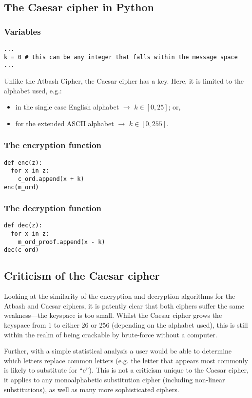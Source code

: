 \documentclass{AIAA}
\begin{document}
\subsection{The Caesar cipher in Python}

\subsubsection{Variables}
\begin{verbatim}
...
k = 0 # this can be any integer that falls within the message space
...
\end{verbatim}
Unlike the Atbash Cipher, the Caesar cipher has a key. Here, it is limited to the alphabet used, e.g.:
\begin{itemize}
	\item in the single case English alphabet $\longrightarrow$ $k \in [0,25]$; or,
	\item for the extended ASCII alphabet $\longrightarrow$ $k \in [0,255]$.
\end{itemize}

\subsubsection{The encryption function}
\begin{verbatim}
def enc(z):
  for x in z:
    c_ord.append(x + k)
enc(m_ord)
\end{verbatim}

\subsubsection{The decryption function}
\begin{verbatim}
def dec(z):
  for x in z:
    m_ord_proof.append(x - k)
dec(c_ord)
\end{verbatim}

\subsection{Criticism of the Caesar cipher}
Looking at the similarity of the encryption and decryption algorithms for the Atbash and Caesar ciphers, it is patently clear that both ciphers suffer the same weakness---the keyspace is too small. Whilst the Caesar cipher grows the keyspace from 1 to either 26 or 256 (depending on the alphabet used), this is still within the realm of being crackable by brute-force without a computer.

Further, with a simple statistical analysis a user would be able to determine which letters replace common letters (e.g. the letter that appears most commonly is likely to substitute for ``e''). This is not a criticism unique to the Caesar cipher, it applies to any monoalphabetic substitution cipher (including non-linear substitutions), as well as many more sophisticated ciphers.
\end{document}
